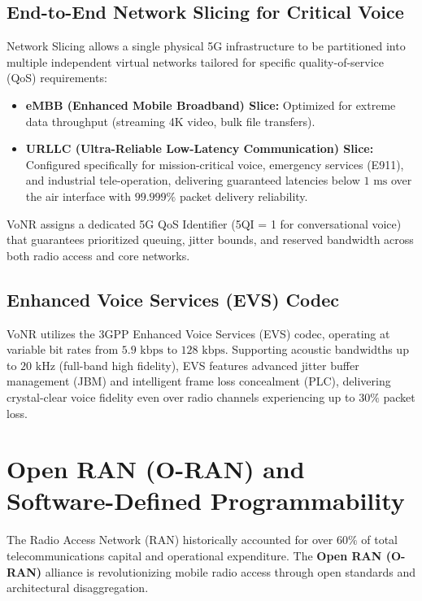 \documentclass[12pt,a4paper]{report}
\begin{document}
\subsection{End-to-End Network Slicing for Critical Voice}
Network Slicing allows a single physical 5G infrastructure to be partitioned into multiple independent virtual networks tailored for specific quality-of-service (QoS) requirements:
\begin{itemize}
    \item \textbf{eMBB (Enhanced Mobile Broadband) Slice:} Optimized for extreme data throughput (streaming 4K video, bulk file transfers).
    \item \textbf{URLLC (Ultra-Reliable Low-Latency Communication) Slice:} Configured specifically for mission-critical voice, emergency services (E911), and industrial tele-operation, delivering guaranteed latencies below $1\text{ ms}$ over the air interface with $99.999\%$ packet delivery reliability.
\end{itemize}
VoNR assigns a dedicated 5G QoS Identifier (5QI = 1 for conversational voice) that guarantees prioritized queuing, jitter bounds, and reserved bandwidth across both radio access and core networks.

\subsection{Enhanced Voice Services (EVS) Codec}
VoNR utilizes the 3GPP Enhanced Voice Services (EVS) codec, operating at variable bit rates from $5.9\text{ kbps}$ to $128\text{ kbps}$. Supporting acoustic bandwidths up to $20\text{ kHz}$ (full-band high fidelity), EVS features advanced jitter buffer management (JBM) and intelligent frame loss concealment (PLC), delivering crystal-clear voice fidelity even over radio channels experiencing up to $30\%$ packet loss.

\section{Open RAN (O-RAN) and Software-Defined Programmability}
The Radio Access Network (RAN) historically accounted for over $60\%$ of total telecommunications capital and operational expenditure. The \textbf{Open RAN (O-RAN)} alliance is revolutionizing mobile radio access through open standards and architectural disaggregation.
\end{document}
